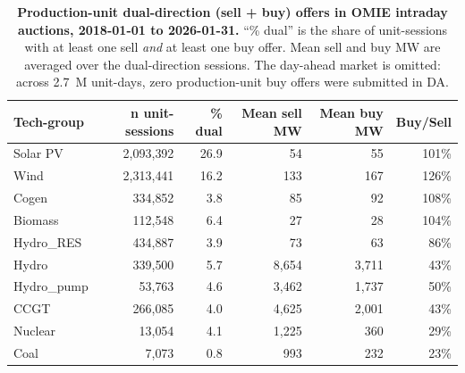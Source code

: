 \documentclass[11pt]{article}
\begin{document}
\begin{table}[h]
\centering
\footnotesize
\caption{\textbf{Production-unit dual-direction (sell + buy) offers in OMIE intraday auctions, 2018-01-01 to 2026-01-31.} ``\% dual'' is the share of unit-sessions with at least one sell \emph{and} at least one buy offer. Mean sell and buy MW are averaged over the dual-direction sessions. The day-ahead market is omitted: across 2.7~M unit-days, zero production-unit buy offers were submitted in DA.}
\label{tab:arb-units}
\begin{tabular}{l r r r r r}
\toprule
Tech-group & n unit-sessions & \% dual & Mean sell MW & Mean buy MW & Buy/Sell \\
\midrule
Solar PV    & 2{,}093{,}392 & 26.9 &     54 &     55 & 101\% \\
Wind        & 2{,}313{,}441 & 16.2 &    133 &    167 & 126\% \\
Cogen       &   334{,}852 &  3.8 &     85 &     92 & 108\% \\
Biomass     &   112{,}548 &  6.4 &     27 &     28 & 104\% \\
\addlinespace
Hydro\_RES  &   434{,}887 &  3.9 &     73 &     63 &  86\% \\
Hydro       &   339{,}500 &  5.7 &  8{,}654 &  3{,}711 &  43\% \\
Hydro\_pump &    53{,}763 &  4.6 &  3{,}462 &  1{,}737 &  50\% \\
\addlinespace
CCGT        &   266{,}085 &  4.0 &  4{,}625 &  2{,}001 &  43\% \\
Nuclear     &    13{,}054 &  4.1 &  1{,}225 &    360 &  29\% \\
Coal        &     7{,}073 &  0.8 &    993 &    232 &  23\% \\
\bottomrule
\end{tabular}
\end{table}
\end{document}
